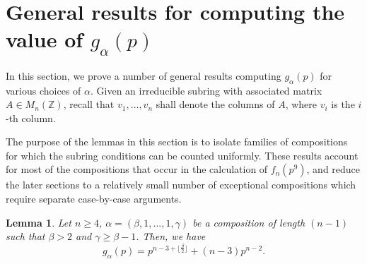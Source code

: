 \documentclass[a4paper]{amsart}
\newtheorem{lemma}[theorem]{Lemma}
\numberwithin{equation}{section}
\theoremstyle{remark}
\newcommand{\Z}{\mathbb{Z}}
\begin{document}
\section{General results for computing the value of $g_\alpha(p)$}\label{s 3}
\par In this section, we prove a number of general results computing $g_\alpha(p)$ for various choices of $\alpha$. Given an irreducible subring with associated matrix $A\in M_n(\Z)$, recall that $v_1, \dots, v_n$ shall denote the columns of $A$, where $v_i$ is the $i$-th column.
\par The purpose of the lemmas in this section is to isolate families of compositions for which the subring conditions can be counted uniformly. These results account for most of the compositions that occur in the calculation of $f_n(p^9)$, and reduce the later sections to a relatively small number of exceptional compositions which require separate case-by-case arguments.
	\begin{lemma}
	 Let $n\geq 4$, $\alpha=(\beta,1, \dots, 1, \gamma)$ be a composition of length $(n-1)$ such that $\beta>2$ and $\gamma\geq \beta-1$. Then, we have 
	 \[g_\alpha(p)=p^{n-3+\lfloor \frac{\beta}{2}\rfloor}+(n-3)p^{n-2}.\]
	\end{lemma}
\end{document}
